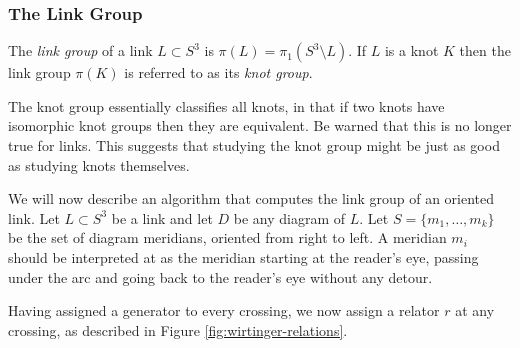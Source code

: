 \documentclass[a4paper]{article}
\theoremstyle{definition}
\begin{document}
\subsubsection{The Link Group}\label{subsubsec:the_knot_group}

The \textit{link group} of a link $L \subset S^3$ is $\pi(L) = \pi_1(S^3 \setminus L)$. If $L$ is a knot $K$ then the link group $\pi(K)$ is referred to as its \textit{knot group}.

The knot group essentially classifies all knots, in that if two knots have isomorphic knot groups then they are equivalent. Be warned that this is no longer true for links. This suggests that studying the knot group might be just as good as studying knots themselves.

We will now describe an algorithm that computes the link group of an oriented link. Let $L \subset S^3$ be a link and let $D$ be any diagram of $L$. Let $S = \{m_1, \dots, m_k\}$ be the set of diagram meridians, oriented from right to left. A meridian $m_i$ should be interpreted at as the meridian starting at the reader's eye, passing under the arc and going back to the reader's eye without any detour.

Having assigned a generator to every crossing, we now assign a relator $r$ at any crossing, as described in Figure \ref{fig:wirtinger-relations}.
\end{document}
